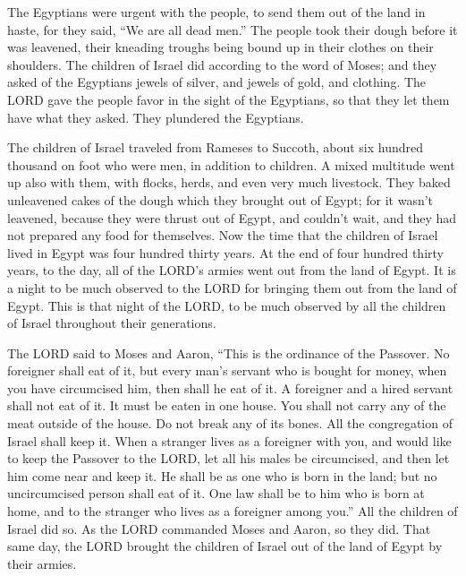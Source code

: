 \myverse{}The Egyptians were urgent with the people, to send them out
of the land in haste, for they said, “We are all dead men.”
\myverse{}The people took their dough before it was leavened, their kneading troughs
being bound up in their clothes on their shoulders.
\myverse{}The children of Israel did according to the word of Moses; and they asked
of the Egyptians jewels of silver, and jewels of gold, and clothing.
\myverse{}The LORD gave the people favor in the sight of the Egyptians, so that they
let them have what they asked. They plundered the Egyptians.

\myverse{}The children of Israel traveled from Rameses to Succoth, about
six hundred thousand on foot who were men, in addition to children.
\myverse{}A mixed multitude went up also with them, with flocks, herds, and even very
much livestock.
\myverse{}They baked unleavened cakes of the dough which they brought out of Egypt;
for it wasn’t leavened, because they were thrust out of Egypt, and couldn’t wait, and they had not prepared
any food for themselves.
\myverse{}Now the time that the children of Israel lived in Egypt was four hundred
thirty years.
\myverse{}At the end of four hundred thirty years, to the day, all of the LORD’s armies
went out from the land of Egypt.
\myverse{}It is a night to be much observed to the LORD for bringing them out from
the land of Egypt. This is that night of the LORD, to be much observed by all the children of Israel throughout
their generations.


\myverse{}The LORD said to Moses and Aaron, “This is the ordinance of
the Passover. No foreigner shall eat of it,
\myverse{}but every man’s servant who is bought for money, when you have circumcised
him, then shall he eat of it.
\myverse{}A foreigner and a hired servant shall not eat of it.
\myverse{}It must be eaten in one house. You shall not carry any of the meat outside
of the house. Do not break any of its bones.
\myverse{}All the congregation of Israel shall keep it.
\myverse{}When a stranger lives as a foreigner with you, and would like to keep the
Passover to the LORD, let all his males be circumcised, and then let him come near and keep it. He shall
be as one who is born in the land; but no uncircumcised person shall eat of it.
\myverse{}One law shall be to him who is born at home, and to the stranger who lives
as a foreigner among you.”
\myverse{}All the children of Israel did so. As the LORD commanded Moses and Aaron,
so they did.
\myverse{}That same day, the LORD brought the children of Israel out of the land of
Egypt by their armies.


